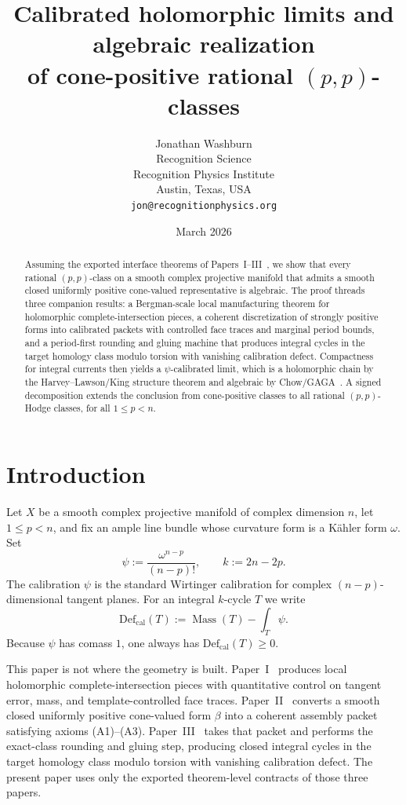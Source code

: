 \documentclass[11pt]{article}
\title{Calibrated holomorphic limits and algebraic realization\\of cone-positive rational $(p,p)$-classes}
\author{Jonathan Washburn\\
Recognition Science\\
Recognition Physics Institute\\
Austin, Texas, USA\\
\texttt{jon@recognitionphysics.org}}
\date{March 2026}
\numberwithin{equation}{section}
\theoremstyle{plain}
\theoremstyle{definition}
\theoremstyle{remark}
\DeclareMathOperator{\Mass}{Mass}
\newcommand{\Defcal}{\mathrm{Def}_{\mathrm{cal}}}
\begin{document}
\maketitle

\begin{abstract}
Assuming the exported interface theorems of Papers~I--III~\cite[Thm.~1.1]{Washburn26I,Washburn26II,Washburn26III}, we show that every rational $(p,p)$-class on a smooth complex projective manifold that admits a smooth closed uniformly positive cone-valued representative is algebraic.  The proof threads three companion results: a Bergman-scale local manufacturing theorem for holomorphic complete-intersection pieces, a coherent discretization of strongly positive forms into calibrated packets with controlled face traces and marginal period bounds, and a period-first rounding and gluing machine that produces integral cycles in the target homology class modulo torsion with vanishing calibration defect.  Compactness for integral currents then yields a $\psi$-calibrated limit, which is a holomorphic chain by the Harvey--Lawson/King structure theorem and algebraic by Chow/GAGA~\cite{HL82,King71,Chow49,Serre56}.  A signed decomposition extends the conclusion from cone-positive classes to all rational $(p,p)$-Hodge classes, for all $1\le p<n$.
\end{abstract}

\section{Introduction}

Let $X$ be a smooth complex projective manifold of complex dimension $n$, let $1\le p<n$, and fix an ample line bundle whose curvature form is a K\"ahler form $\omega$. Set
\[
\psi:=\frac{\omega^{n-p}}{(n-p)!},
\qquad
k:=2n-2p.
\]
The calibration $\psi$ is the standard Wirtinger calibration for complex $(n-p)$-dimensional tangent planes. For an integral $k$-cycle $T$ we write
\[
\Defcal(T):=\Mass(T)-\int_T \psi.
\]
Because $\psi$ has comass $1$, one always has $\Defcal(T)\ge 0$.

This paper is not where the geometry is built. Paper~I~\cite[Thm.~1.1]{Washburn26I} produces local holomorphic complete-intersection pieces with quantitative control on tangent error, mass, and template-controlled face traces. Paper~II~\cite[Thm.~1.1]{Washburn26II} converts a smooth closed uniformly positive cone-valued form $\beta$ into a coherent assembly packet satisfying axioms (A1)--(A3). Paper~III~\cite[Thm.~1.1]{Washburn26III} takes that packet and performs the exact-class rounding and gluing step, producing closed integral cycles in the target homology class modulo torsion with vanishing calibration defect. The present paper uses only the exported theorem-level contracts of those three papers.
\end{document}
